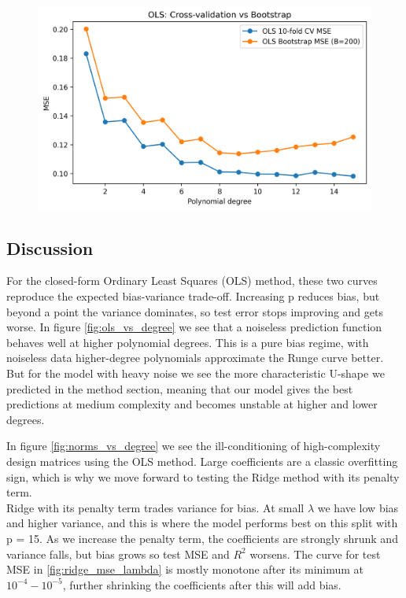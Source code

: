 \documentclass[amssymb,twocolumn,aps]{revtex4-2}
\begin{document}
\begin{figure}[H]
    \centering
    \includegraphics[width=1\linewidth]{Project-1/Figures/OLS_cv_vs_bootstrap.png}
    \caption{}
    \label{fig:}
\end{figure}

\subsection{Discussion}

For the closed-form Ordinary Least Squares (OLS) method, these two curves reproduce the expected bias-variance trade-off. Increasing p reduces bias, but beyond a point the variance dominates, so test error stops improving and gets worse. In figure \ref{fig:ols_vs_degree} we see that a noiseless prediction function behaves well at higher polynomial degrees. This is a pure bias regime, with noiseless data higher-degree polynomials approximate the Runge curve better. But for the model with heavy noise we see the more characteristic U-shape we predicted in the method section, meaning that our model gives the best predictions at medium complexity and becomes unstable at higher and lower degrees.

In figure \ref{fig:norms_vs_degree} we see the ill-conditioning of high-complexity design matrices using the OLS method. Large coefficients are a classic overfitting sign, which is why we move forward to testing the Ridge method with its penalty term. \\

Ridge with its penalty term trades variance for bias. At small $\lambda$ we have low bias and higher variance, and this is where the model performs best on this split with p = 15. As we increase the penalty term, the coefficients are strongly shrunk and variance falls, but bias grows so test MSE and $R^2$ worsens. The curve for test MSE in \ref{fig:ridge_mse_lambda} is mostly monotone after its minimum at $10^{-4}-10^{-5}$, further shrinking the coefficients after this will add bias. \\
\end{document}
